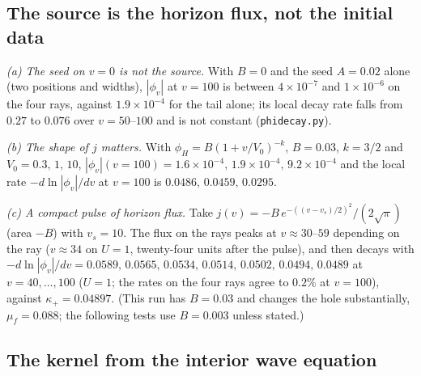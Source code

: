 \documentclass[11pt]{article}
\begin{document}
\subsection{The source is the horizon flux, not the initial data}
\label{sec:src}

\emph{(a) The seed on $v=0$ is not the source.} With $B=0$ and the seed $A=0.02$ alone (two positions and widths), $|\phi_v|$ at $v=100$ is between $4\times10^{-7}$ and $1\times10^{-6}$ on the four rays, against $1.9\times10^{-4}$ for the tail alone; its local decay rate falls from $0.27$ to $0.076$ over $v=50$--$100$ and is not constant (\texttt{phidecay.py}).

\emph{(b) The shape of $j$ matters.} With $\phi_H=B(1+v/V_0)^{-k}$, $B=0.03$, $k=3/2$ and $V_0=0.3,\,1,\,10$, $|\phi_v|(v=100)=1.6\times10^{-4},\,1.9\times10^{-4},\,9.2\times10^{-4}$ and the local rate $-d\ln|\phi_v|/dv$ at $v=100$ is $0.0486,\,0.0459,\,0.0295$.

\emph{(c) A compact pulse of horizon flux.} Take $j(v)=-B\,e^{-((v-v_s)/2)^2}/(2\sqrt\pi)$ (area $-B$) with $v_s=10$. The flux on the rays peaks at $v\approx30$--$59$ depending on the ray ($v\approx34$ on $U=1$, twenty-four units after the pulse), and then decays with $-d\ln|\phi_v|/dv=0.0589,\,0.0565,\,0.0534,\,0.0514,\,0.0502,\,0.0494,\,0.0489$ at $v=40,\dots,100$ ($U=1$; the rates on the four rays agree to $0.2\%$ at $v=100$), against $\kappa_+=0.04897$. (This run has $B=0.03$ and changes the hole substantially, $\mu_f=0.088$; the following tests use $B=0.003$ unless stated.)

\subsection{The kernel from the interior wave equation}
\label{sec:kernel-deriv}
\end{document}
